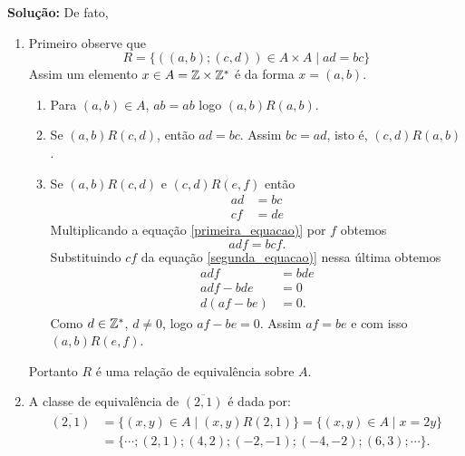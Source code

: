 \documentclass[12pt]{article}
\begin{document}
\noindent\textbf{Solu\c{c}\~ao:} De fato,
	\begin{enumerate}[label={\alph*})]
		\item Primeiro observe que
		\[
			R = \{((a,b);(c,d)) \in A \times A \mid ad = bc\}
		\]
		Assim um elemento $x \in A = \mathbb{Z}\times\mathbb{Z}^*$ é da forma $x = (a,b)$.
		\begin{enumerate}[label={\roman*})]
			\item Para $(a,b) \in A$, $ab = ab$ logo $(a,b)R(a,b)$.
			\item Se $(a,b)R(c,d)$, então $ad = bc$. Assim $bc = ad$, isto é, $(c,d)R(a,b)$.
			\item Se $(a,b)R(c,d)$ e $(c,d)R(e,f)$ então
			\begin{align}
				ad &= bc\label{primeira_equacao)}\\
				cf &= de\label{segunda_equacao)}
			\end{align}
			Multiplicando a equação \eqref{primeira_equacao)} por $f$ obtemos
			\[
				adf = bcf.
			\]
			Substituindo $cf$ da equação \eqref{segunda_equacao)} nessa última obtemos
			\begin{align*}
				adf &= bde\\
				adf - bde &= 0\\
				d(af - be) &= 0.
			\end{align*}
			Como $d \in \mathbb{Z}^*$, $d \ne 0$, logo $af - be = 0$. Assim $af = be$ e com isso $(a,b)R(e,f)$.
		\end{enumerate}

		Portanto $R$ é uma relação de equivalência sobre $A$.

		\item A classe de equivalência de $\overline{(2,1)}$ é dada por:
		\begin{align*}
			\overline{(2,1)} &= \{(x,y) \in A \mid (x,y)R(2,1)\} = \{(x,y) \in A \mid x = 2y\} \\
			&= \{\cdots; (2,1); (4,2); (-2,-1);(-4,-2);(6,3);\cdots\}.
		\end{align*}
	\end{enumerate}
\end{document}
